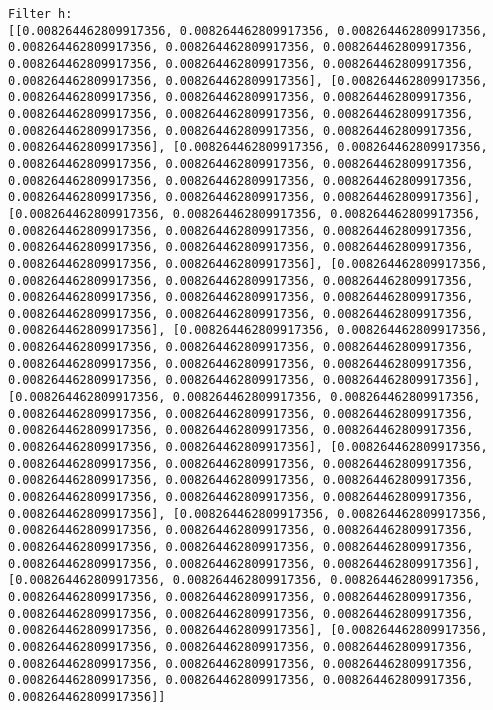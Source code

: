 \documentclass[11pt]{article}
\begin{document}
    \begin{Verbatim}[commandchars=\\\{\}]
Filter h:
[[0.008264462809917356, 0.008264462809917356, 0.008264462809917356, 0.008264462809917356, 0.008264462809917356, 0.008264462809917356, 0.008264462809917356, 0.008264462809917356, 0.008264462809917356, 0.008264462809917356, 0.008264462809917356], [0.008264462809917356, 0.008264462809917356, 0.008264462809917356, 0.008264462809917356, 0.008264462809917356, 0.008264462809917356, 0.008264462809917356, 0.008264462809917356, 0.008264462809917356, 0.008264462809917356, 0.008264462809917356], [0.008264462809917356, 0.008264462809917356, 0.008264462809917356, 0.008264462809917356, 0.008264462809917356, 0.008264462809917356, 0.008264462809917356, 0.008264462809917356, 0.008264462809917356, 0.008264462809917356, 0.008264462809917356], [0.008264462809917356, 0.008264462809917356, 0.008264462809917356, 0.008264462809917356, 0.008264462809917356, 0.008264462809917356, 0.008264462809917356, 0.008264462809917356, 0.008264462809917356, 0.008264462809917356, 0.008264462809917356], [0.008264462809917356, 0.008264462809917356, 0.008264462809917356, 0.008264462809917356, 0.008264462809917356, 0.008264462809917356, 0.008264462809917356, 0.008264462809917356, 0.008264462809917356, 0.008264462809917356, 0.008264462809917356], [0.008264462809917356, 0.008264462809917356, 0.008264462809917356, 0.008264462809917356, 0.008264462809917356, 0.008264462809917356, 0.008264462809917356, 0.008264462809917356, 0.008264462809917356, 0.008264462809917356, 0.008264462809917356], [0.008264462809917356, 0.008264462809917356, 0.008264462809917356, 0.008264462809917356, 0.008264462809917356, 0.008264462809917356, 0.008264462809917356, 0.008264462809917356, 0.008264462809917356, 0.008264462809917356, 0.008264462809917356], [0.008264462809917356, 0.008264462809917356, 0.008264462809917356, 0.008264462809917356, 0.008264462809917356, 0.008264462809917356, 0.008264462809917356, 0.008264462809917356, 0.008264462809917356, 0.008264462809917356, 0.008264462809917356], [0.008264462809917356, 0.008264462809917356, 0.008264462809917356, 0.008264462809917356, 0.008264462809917356, 0.008264462809917356, 0.008264462809917356, 0.008264462809917356, 0.008264462809917356, 0.008264462809917356, 0.008264462809917356], [0.008264462809917356, 0.008264462809917356, 0.008264462809917356, 0.008264462809917356, 0.008264462809917356, 0.008264462809917356, 0.008264462809917356, 0.008264462809917356, 0.008264462809917356, 0.008264462809917356, 0.008264462809917356], [0.008264462809917356, 0.008264462809917356, 0.008264462809917356, 0.008264462809917356, 0.008264462809917356, 0.008264462809917356, 0.008264462809917356, 0.008264462809917356, 0.008264462809917356, 0.008264462809917356, 0.008264462809917356]]

    \end{Verbatim}
\end{document}
